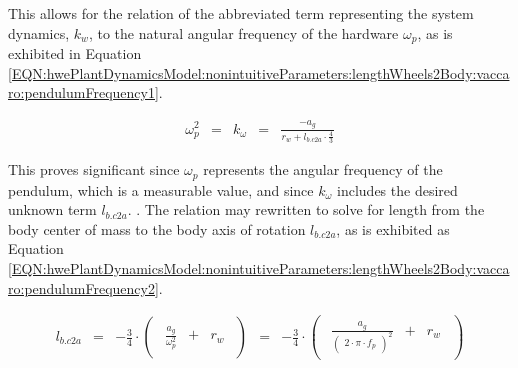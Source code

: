 \documentclass[crop=false,float=true,class=scrreprt]{standalone}
\begin{document}
This allows for the relation of the abbreviated term representing the system dynamics, $k_{w}$, 
to the natural angular frequency of the hardware {} $\omega_{p}$, 
as is exhibited in Equation~%
\eqref{EQN:hwePlantDynamicsModel:nonintuitiveParameters:lengthWheels2Body:vaccaro:pendulumFrequency1}.


\begin{equation}
\label{EQN:hwePlantDynamicsModel:nonintuitiveParameters:lengthWheels2Body:vaccaro:pendulumFrequency1}
\begin{array}{ccccccccc}
\omega_{p}^{2}
& = &
k_{\omega}
& = &
\displaystyle\frac
{-a_{g} }
{
r_{w} + l_{b.c2a} \cdot \displaystyle\frac{4}{3}
}
\end{array}
\end{equation}




This proves significant since $\omega_{p}$ represents 
the angular frequency of the pendulum,
which is a measurable value,
and since $k_{\omega}$ includes the desired unknown term $l_{b.c2a}$.
{}.
The relation may rewritten to solve for
length from the body center of mass to the body axis of rotation $l_{b.c2a}$,
as is exhibited as Equation~%
\eqref{EQN:hwePlantDynamicsModel:nonintuitiveParameters:lengthWheels2Body:vaccaro:pendulumFrequency2}.





\begin{equation}
\label{EQN:hwePlantDynamicsModel:nonintuitiveParameters:lengthWheels2Body:vaccaro:pendulumFrequency2}
\begin{array}{ccccccccc}
l_{b.c2a}
& = &
\displaystyle -\frac{3}{4} 
\cdot
\begin{pmatrix}
\begin{array}{ccc}
\displaystyle \frac{a_{g}}{\omega_{p}^{2}} & + & r_{w}
\end{array}
\end{pmatrix}
& = &
\displaystyle -\frac{3}{4} 
\cdot
\begin{pmatrix}
\begin{array}{ccc}
\displaystyle \frac{a_{g}}
{\begin{pmatrix}2 \cdot \pi \cdot f_{p} \end{pmatrix}^{2}} & + & r_{w}
\end{array}
\end{pmatrix}
\end{array}
\end{equation}




\clearpage
\end{document}
